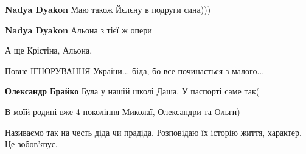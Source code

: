 \begin{itemize}
\begin{itemize}
 
\textbf{Nadya Dyakon}
Маю також Йєлєну в подруги сина)))

 
\textbf{Nadya Dyakon}
Альона з тієї ж опери

 
А ще Крістіна, Альона,

 
Повне ІГНОРУВАННЯ України... біда, бо все починається з малого...

 
\textbf{Олександр Брайко} Була у нашій школі Даша. У паспорті саме так(
\end{itemize}

 

В моїй родині вже 4 покоління Миколаї, Олександри та Ольги)

Називаємо так на честь діда чи прадіда. Розповідаю їх історію життя, характер.
Це зобов'язує.

\begin{itemize}
 

\end{itemize}
\end{itemize}
